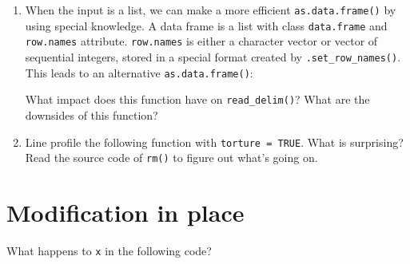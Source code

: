 \begin{enumerate}
\def\labelenumi{\arabic{enumi}.}
\item
  When the input is a list, we can make a more efficient
  \texttt{as.data.frame()} by using special knowledge. A data frame is a
  list with class \texttt{data.frame} and \texttt{row.names} attribute.
  \texttt{row.names} is either a character vector or vector of
  sequential integers, stored in a special format created by
  \texttt{.set\_row\_names()}. This leads to an alternative
  \texttt{as.data.frame()}:

\begin{Shaded}
\begin{Highlighting}[]
\StringTok{ }
  \NormalTok{) <-}\StringTok{ }\NormalTok{(}\NormalTok{(x[[}\NormalTok{]]))}
\NormalTok{\}}
\end{Highlighting}
\end{Shaded}

  What impact does this function have on \texttt{read\_delim()}? What
  are the downsides of this function?
\item
  Line profile the following function with \texttt{torture\ =\ TRUE}.
  What is surprising? Read the source code of \texttt{rm()} to figure
  out what's going on.

\begin{Shaded}
\begin{Highlighting}[]
\StringTok{ }\NormalTok{(} \NormalTok{) \{}
\StringTok{ }\NormalTok{(}
\NormalTok{\}}
\end{Highlighting}
\end{Shaded}
\end{enumerate}

\hypertarget{modification}{%
\section{Modification in place}\label{modification}}

What happens to \texttt{x} in the following code?
 

\begin{Shaded}
\begin{Highlighting}[]
\StringTok{ }\OperatorTok{:}
\NormalTok{x[}\NormalTok{] <-}\StringTok{ }
\end{Highlighting}
\end{Shaded}

